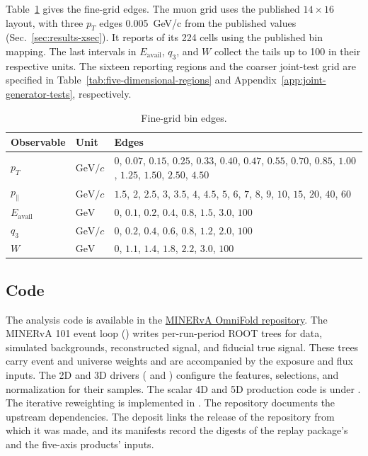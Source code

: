 \label{app:release-edges} Table~\ref{tab:reproducibility-bin-edges} gives the fine-grid edges. The muon grid uses the published $14\times16$ layout, with three $p_T$ edges \SI{0.005}{GeV/c} from the published values (Sec.~\ref{sec:results-xsec}). It reports  of its 224 cells using the published bin mapping. The last intervals in $E_{\mathrm{avail}}$, $q_3$, and $W$ collect the tails up to 100 in their respective units. The sixteen reporting regions and the coarser joint-test grid are specified in Table~\ref{tab:five-dimensional-regions} and Appendix~\ref{app:joint-generator-tests}, respectively.

\begin{table}[tbp]
  \centering
  \caption{Fine-grid bin edges.}
  \label{tab:reproducibility-bin-edges}
  \begin{tabular}{@{}ll>{\raggedright\arraybackslash}p{}@{}}
    \toprule
    Observable & Unit & Edges \\
    \midrule
    $p_T$ & $\mathrm{GeV}/c$ &
    $0$, $0.07$, $0.15$, $0.25$, $0.33$, $0.40$, $0.47$, $0.55$, $0.70$, $0.85$,
    $1.00$, $1.25$, $1.50$, $2.50$, $4.50$ \\
    $p_\parallel$ & $\mathrm{GeV}/c$ &
    $1.5$, $2$, $2.5$, $3$, $3.5$, $4$, $4.5$, $5$, $6$, $7$, $8$, $9$, $10$,
    $15$, $20$, $40$, $60$ \\
    $E_{\mathrm{avail}}$ & $\mathrm{GeV}$ & $0$, $0.1$, $0.2$, $0.4$, $0.8$, $1.5$, $3.0$, $100$ \\
    $q_3$ & $\mathrm{GeV}/c$ & $0$, $0.2$, $0.4$, $0.6$, $0.8$, $1.2$, $2.0$, $100$ \\
    $W$ & $\mathrm{GeV}$ & $0$, $1.1$, $1.4$, $1.8$, $2.2$, $3.0$, $100$ \\
    \bottomrule
  \end{tabular}
\end{table}

\subsection{Code}
\label{app:analysis-code}
\label{app:codebase}

The analysis code is available in the \href{https://github.com/josephbaileyy/MINERvA-OmniFold}{MINERvA OmniFold repository}. The MINERvA 101 event loop () writes per-run-period ROOT trees for data, simulated backgrounds, reconstructed signal, and fiducial true signal. These trees carry event and universe weights and are accompanied by the exposure and flux inputs. The 2D and 3D drivers ( and ) configure the features, selections, and normalization for their samples. The scalar 4D and 5D production code is under . The iterative reweighting is implemented in . The repository documents the upstream dependencies. The deposit links the release of the repository from which it was made, and its manifests record the digests of the replay package's and the five-axis products' inputs.

